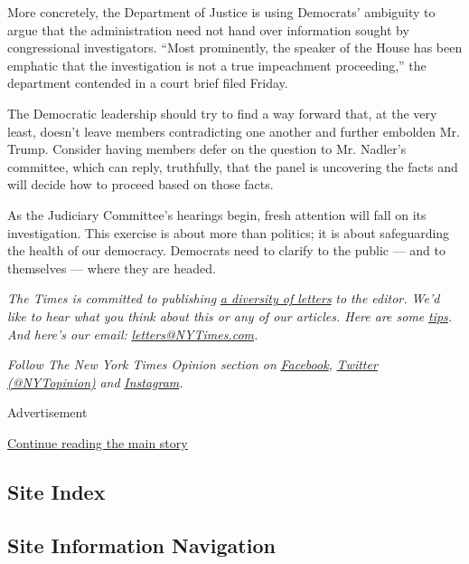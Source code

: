 More concretely, the Department of Justice is using Democrats' ambiguity
to argue that the administration need not hand over information sought
by congressional investigators. ``Most prominently, the speaker of the
House has been emphatic that the investigation is not a true impeachment
proceeding,'' the department contended in a court brief filed Friday.

The Democratic leadership should try to find a way forward that, at the
very least, doesn't leave members contradicting one another and further
embolden Mr. Trump. Consider having members defer on the question to Mr.
Nadler's committee, which can reply, truthfully, that the panel is
uncovering the facts and will decide how to proceed based on those
facts.

As the Judiciary Committee's hearings begin, fresh attention will fall
on its investigation. This exercise is about more than politics; it is
about safeguarding the health of our democracy. Democrats need to
clarify to the public --- and to themselves --- where they are headed.

\emph{The Times is committed to publishing}
\href{https://www.nytimes3xbfgragh.onion/2019/01/31/opinion/letters/letters-to-editor-new-york-times-women.html}{\emph{a
diversity of letters}} \emph{to the editor. We'd like to hear what you
think about this or any of our articles. Here are some}
\href{https://help.nytimes3xbfgragh.onion/hc/en-us/articles/115014925288-How-to-submit-a-letter-to-the-editor}{\emph{tips}}\emph{.
And here's our email:}
\href{mailto:letters@NYTimes.com}{\emph{letters@NYTimes.com}}\emph{.}

\emph{Follow The New York Times Opinion section on}
\href{https://www.facebookcorewwwi.onion/nytopinion}{\emph{Facebook}}\emph{,}
\href{http://twitter.com/NYTOpinion}{\emph{Twitter (@NYTopinion)}}
\emph{and}
\href{https://www.instagram.com/nytopinion/}{\emph{Instagram}}\emph{.}

Advertisement

\protect\hyperlink{after-bottom}{Continue reading the main story}

\hypertarget{site-index}{%
\subsection{Site Index}\label{site-index}}

\hypertarget{site-information-navigation}{%
\subsection{Site Information
Navigation}\label{site-information-navigation}}

